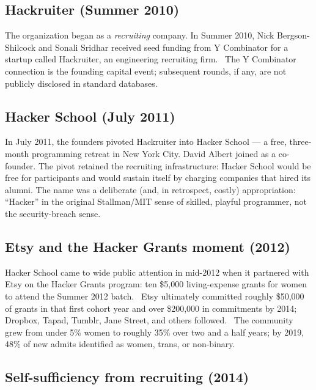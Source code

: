 \documentclass[10pt,letterpaper,twocolumn]{article}
\begin{document}
\subsection{Hackruiter (Summer 2010)}

The organization began as a \emph{recruiting} company. In Summer 2010, Nick Bergson-Shilcock and Sonali Sridhar received seed funding from Y Combinator for a startup called Hackruiter, an engineering recruiting firm.~\citep{wikipediarc,ycrcprofile} The Y Combinator connection is the founding capital event; subsequent rounds, if any, are not publicly disclosed in standard databases.

\subsection{Hacker School (July 2011)}

In July 2011, the founders pivoted Hackruiter into Hacker School --- a free, three-month programming retreat in New York City. David Albert joined as a co-founder. The pivot retained the recruiting infrastructure: Hacker School would be free for participants and would sustain itself by charging companies that hired its alumni. The name was a deliberate (and, in retrospect, costly) appropriation: ``Hacker'' in the original Stallman/MIT sense of skilled, playful programmer, not the security-breach sense.~\citep{rchackerpost}

\subsection{Etsy and the Hacker Grants moment (2012)}

Hacker School came to wide public attention in mid-2012 when it partnered with Etsy on the Hacker Grants program: ten \$5,000 living-expense grants for women to attend the Summer 2012 batch.~\citep{forbeshackergrants} Etsy ultimately committed roughly \$50,000 of grants in that first cohort year and over \$200,000 in commitments by 2014; Dropbox, Tapad, Tumblr, Jane Street, and others followed.~\citep{rcdropboxetsyetc} The community grew from under 5\% women to roughly 35\% over two and a half years; by 2019, 48\% of new admits identified as women, trans, or non-binary.~\citep{rcseven}

\subsection{Self-sufficiency from recruiting (2014)}
\end{document}
